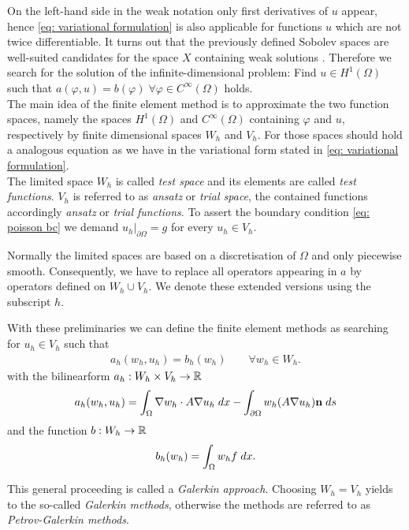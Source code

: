On the left-hand side in the weak notation only first derivatives of $u$ appear, hence \eqref{eq: variational formulation} is also applicable for functions $u$ which are not twice differentiable. It turns out that the previously defined Sobolev spaces are well-suited candidates for the space $X$ containing weak solutions \cite[Chapter 1]{BS2002}. Therefore we search for the solution of the infinite-dimensional problem: Find $u\in H^1(\Omega)$ such that  $a(\varphi,u)  = b(\varphi) \;\forall \varphi \in C^\infty(\Omega)$ holds. \\%
The main idea of the finite element method is to approximate the two function spaces, namely the spaces $H^1(\Omega)$ and $C^\infty(\Omega)$ containing $\varphi$ and $u$, respectively by finite dimensional spaces $W_h$ and $V_h$. For those spaces should hold a analogous equation as we have in the variational form stated in \eqref{eq: variational formulation}.\\
The limited space $W_h$ is called \emph{test space} and its elements are called \emph{test functions}. $V_h$ is referred to as \emph{ansatz} or \emph{trial space}, the contained functions accordingly \emph{ansatz} or \emph{trial functions}. To assert the boundary condition \eqref{eq: poisson bc} we demand $u_h|_{\partial \Omega} = g$ for every $u_h \in V_h$.

Normally the limited spaces are based on a discretisation of $\Omega$ and only piecewise smooth. Consequently, we have to replace all operators appearing in $a$ by operators defined on $W_h \cup V_h$. We denote these extended versions using the subscript $h$.

With these preliminaries we can define the finite element methods as searching for $u_h \in V_h$ such that 
\begin{align}
a_h(w_h,u_h) = b_h(w_h) \qquad \forall w_h \in W_h. \label{eq: FE variational formulation}
\end{align}
with the bilinearform  $a_h:W_h \times V_h \rightarrow \mathbb{R}$
\begin{align*}
a_h(w_h,u_h)  = \int_{\Omega} {{ \nabla w_h  \cdot A\nabla u_h}\;dx} -\int_{\partial \Omega} {{ w_h (A\nabla u_h) \mathbf{n}}\;ds}
\end{align*}
and the function $b:W_h \rightarrow \mathbb{R}$
\begin{align*}
b_h(w_h) = \int_{\Omega} {{ w_h f}\;dx}.
\end{align*}

This general proceeding is called a \emph{Galerkin approach}. Choosing $W_h = V_h$ yields to the so-called \emph{Galerkin methods}, otherwise the methods are referred to as \emph{Petrov-Galerkin methods}.

